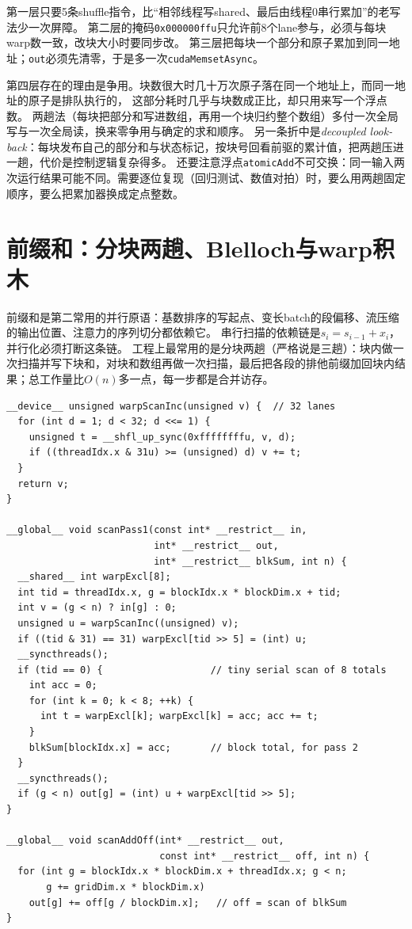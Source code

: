 \documentclass[12pt,a4paper,fontset=fandol]{ctexbook}
\newcommand{\Tp}[1]{\texttt{#1}}
\begin{document}
第一层只要5条shuffle指令，比``相邻线程写shared、最后由线程0串行累加''的老写法少一次屏障。
第二层的掩码\Tp{0x000000ffu}只允许前8个lane参与，必须与每块warp数一致，改块大小时要同步改。
第三层把每块一个部分和原子累加到同一地址；\Tp{out}必须先清零，于是多一次\Tp{cudaMemsetAsync}。

第四层存在的理由是争用。块数很大时几十万次原子落在同一个地址上，而同一地址的原子是排队执行的，
这部分耗时几乎与块数成正比，却只用来写一个浮点数。
两趟法（每块把部分和写进数组，再用一个块归约整个数组）多付一次全局写与一次全局读，换来零争用与确定的求和顺序。
另一条折中是\emph{decoupled look-back}：每块发布自己的部分和与状态标记，按块号回看前驱的累计值，把两趟压进一趟，代价是控制逻辑复杂得多。
还要注意浮点\Tp{atomicAdd}不可交换：同一输入两次运行结果可能不同。需要逐位复现（回归测试、数值对拍）时，要么用两趟固定顺序，要么把累加器换成定点整数。

\section{前缀和：分块两趟、Blelloch与warp积木}

前缀和是第二常用的并行原语：基数排序的写起点、变长batch的段偏移、流压缩的输出位置、注意力的序列切分都依赖它。
串行扫描的依赖链是$s_i = s_{i-1} + x_i$，并行化必须打断这条链。
工程上最常用的是分块两趟（严格说是三趟）：块内做一次扫描并写下块和，对块和数组再做一次扫描，最后把各段的排他前缀加回块内结果；总工作量比$O(n)$多一点，每一步都是合并访存。

\begin{lstlisting}[style=cudastyle,caption={warp 扫描积木与两趟法的第一、第三段核函数}]
__device__ unsigned warpScanInc(unsigned v) {  // 32 lanes
  for (int d = 1; d < 32; d <<= 1) {
    unsigned t = __shfl_up_sync(0xffffffffu, v, d);
    if ((threadIdx.x & 31u) >= (unsigned) d) v += t;
  }
  return v;
}

__global__ void scanPass1(const int* __restrict__ in,
                          int* __restrict__ out,
                          int* __restrict__ blkSum, int n) {
  __shared__ int warpExcl[8];
  int tid = threadIdx.x, g = blockIdx.x * blockDim.x + tid;
  int v = (g < n) ? in[g] : 0;
  unsigned u = warpScanInc((unsigned) v);
  if ((tid & 31) == 31) warpExcl[tid >> 5] = (int) u;
  __syncthreads();
  if (tid == 0) {                   // tiny serial scan of 8 totals
    int acc = 0;
    for (int k = 0; k < 8; ++k) {
      int t = warpExcl[k]; warpExcl[k] = acc; acc += t;
    }
    blkSum[blockIdx.x] = acc;       // block total, for pass 2
  }
  __syncthreads();
  if (g < n) out[g] = (int) u + warpExcl[tid >> 5];
}

__global__ void scanAddOff(int* __restrict__ out,
                           const int* __restrict__ off, int n) {
  for (int g = blockIdx.x * blockDim.x + threadIdx.x; g < n;
       g += gridDim.x * blockDim.x)
    out[g] += off[g / blockDim.x];   // off = scan of blkSum
}
\end{lstlisting}
\end{document}
